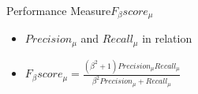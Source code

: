 \begin{frame}{Performance Measure}{$F_{\beta}score_{\mu}$}
    \begin{center}
        \begin{itemize}
            \item $Precision_{\mu}$ and $Recall_{\mu}$ in relation
            \pause
            \item $F_{\beta}score_{\mu} = \frac{(\beta^2 + 1)Precision_{\mu} Recall_{\mu}}{\beta^2 Precision_{\mu} + Recall_{\mu}}$
        \end{itemize}
    \end{center}
\end{frame}
